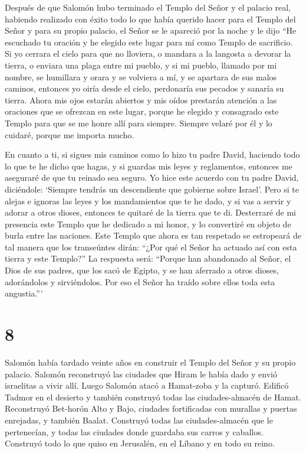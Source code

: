 Después de que Salomón hubo terminado el Templo del Señor
y el palacio real, habiendo realizado con éxito todo lo que había
querido hacer para el Templo del Señor y para su propio palacio,
 el Señor se le apareció por la noche y le dijo ``He
escuchado tu oración y he elegido este lugar para mí como Templo de
sacrificio.  Si yo cerrara el cielo para que no lloviera, o
mandara a la langosta a devorar la tierra, o enviara una plaga entre mi
pueblo,  y si mi pueblo, llamado por mi nombre, se
humillara y orara y se volviera a mí, y se apartara de sus malos
caminos, entonces yo oiría desde el cielo, perdonaría sus pecados y
sanaría su tierra.  Ahora mis ojos estarán abiertos y mis
oídos prestarán atención a las oraciones que se ofrezcan en este lugar,
 porque he elegido y consagrado este Templo para que se me
honre allí para siempre. Siempre velaré por él y lo cuidaré, porque me
importa mucho.

 En cuanto a ti, si sigues mis caminos como lo hizo tu
padre David, haciendo todo lo que te he dicho que hagas, y si guardas
mis leyes y reglamentos,  entonces me aseguraré de que tu
reinado sea seguro. Yo hice este acuerdo con tu padre David, diciéndole:
`Siempre tendrás un descendiente que gobierne sobre Israel'.
 Pero si te alejas e ignoras las leyes y los mandamientos
que te he dado, y si vas a servir y adorar a otros dioses, 
entonces te quitaré de la tierra que te di. Desterraré de mi presencia
este Templo que he dedicado a mi honor, y lo convertiré en objeto de
burla entre las naciones.  Este Templo que ahora es tan
respetado se estropeará de tal manera que los transeúntes dirán: ``¿Por
qué el Señor ha actuado así con esta tierra y este Templo?''
 La respuesta será: ``Porque han abandonado al Señor, el
Dios de sus padres, que los sacó de Egipto, y se han aferrado a otros
dioses, adorándolos y sirviéndolos. Por eso el Señor ha traído sobre
ellos toda esta angustia.'''

\hypertarget{section-7}{%
\section{8}\label{section-7}}

 Salomón había tardado veinte años en construir el Templo
del Señor y su propio palacio.  Salomón reconstruyó las
ciudades que Hiram le había dado y envió israelitas a vivir allí.
 Luego Salomón atacó a Hamat-zoba y la capturó. 
Edificó Tadmor en el desierto y también construyó todas las
ciudades-almacén de Hamat.  Reconstruyó Bet-horón Alto y
Bajo, ciudades fortificadas con murallas y puertas enrejadas,
 y también Baalat. Construyó todas las ciudades-almacén que
le pertenecían, y todas las ciudades donde guardaba sus carros y
caballos. Construyó todo lo que quiso en Jerusalén, en el Líbano y en
todo su reino.

